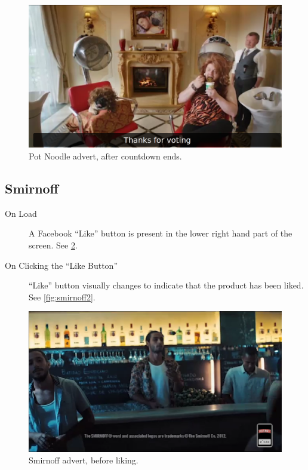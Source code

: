 	\begin{figure}[th]
		\centering
		\includegraphics[width=\textwidth,height=0.5\textheight,keepaspectratio]{images/adverts/pot_noodle-4.png}
		\caption{Pot Noodle advert, after countdown ends.}
		\label{fig:potNoodle4}
	\end{figure}

\clearpage
\subsection{Smirnoff}
	\begin{description}
		\item[On Load]{A Facebook ``Like'' button is present in the lower right hand part of the screen. See \ref{fig:smirnoff1}.}
		\item[On Clicking the ``Like Button'']{``Like'' button visually changes to indicate that the product has been liked. See \ref{fig:smirnoff2}.}
	\end{description}

	\begin{figure}[th]
		\centering
		\includegraphics[width=\textwidth,height=0.5\textheight,keepaspectratio]{images/adverts/smirnoff-1.png}
		\caption{Smirnoff advert, before liking.}
		\label{fig:smirnoff1}
	\end{figure}

